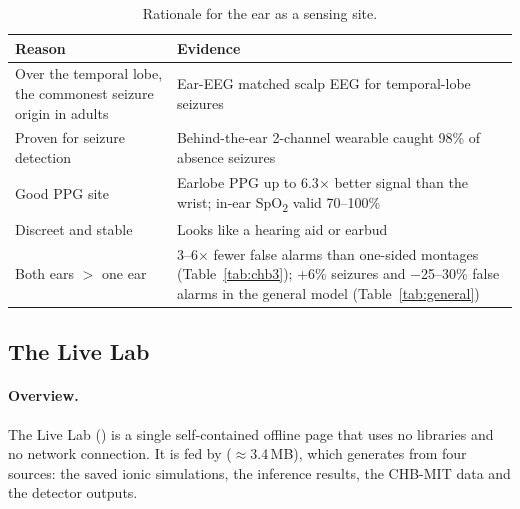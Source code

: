 \begin{table}[htbp]
\centering\small
\caption{Rationale for the ear as a sensing site.}
\label{tab:whyear}
\begin{tabularx}{\linewidth}{@{}l L@{}}
\toprule
Reason & Evidence \\
\midrule
Over the temporal lobe, the commonest seizure origin in adults & Ear-EEG matched scalp EEG for temporal-lobe seizures \cite{zibrandtsen2017} \\
Proven for seizure detection & Behind-the-ear 2-channel wearable caught 98\% of absence seizures \cite{swinnen2021} \\
Good PPG site & Earlobe PPG up to 6.3$\times$ better signal than the wrist; in-ear SpO\textsubscript{2} valid 70--100\% \cite{bubb2023} \\
Discreet and stable & Looks like a hearing aid or earbud \\
Both ears $>$ one ear & 3--6$\times$ fewer false alarms than one-sided montages (Table~\ref{tab:chb3}); +6\% seizures and $-$25--30\% false alarms in the general model (Table~\ref{tab:general}) \\
\bottomrule
\end{tabularx}
\end{table}

\subsection{The Live Lab}

\paragraph{Overview.} The Live Lab () is a single self-contained offline page that uses no libraries and no network connection. It is fed by  ($\approx$3.4\,MB), which  generates from four sources: the saved ionic simulations, the inference results, the CHB-MIT data and the detector outputs.

